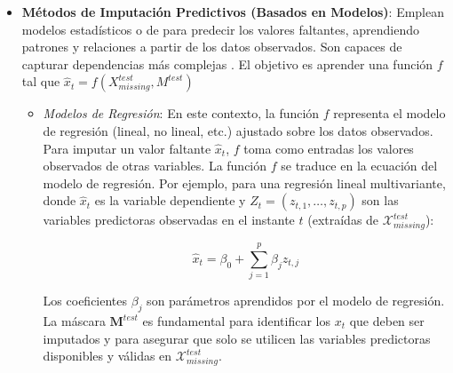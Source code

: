 \begin{itemize}
\begin{itemize}
            \item \textit{Imputación por Mediana}: Similar al anterior, pero utiliza la mediana de los valores observados, lo que lo hace más robusto a valores atípicos (outliers) \citep{Enders2010applied}:
            \begin{equation}
            \hat{x}_t = \text{mediana}(X_{\text{missing}})
            \label{eq:median_imputation}
            \end{equation}
            Comparte limitaciones similares a la imputación por media en cuanto a la distorsión de la estructura de la serie.
        \end{itemize}
        Aunque simples, estos métodos tienden a subestimar la varianza y aplanar la estructura temporal de la serie, y son generalmente inapropiados si la serie no es estacionaria o si los datos faltantes no son completamente al azar.

    \item \textbf{Métodos de Imputación Predictivos (Basados en Modelos)}:
    Emplean modelos estadísticos o de  para predecir los valores faltantes, aprendiendo patrones y relaciones a partir de los datos observados. Son capaces de capturar dependencias más complejas \citep{AbuMostafa2012}. El objetivo es aprender una función $f$ tal que $\hat{x}_t = f(X_{missing}^{test}, M^{test})$

        \begin{itemize}
            \item \textit{Modelos de Regresión}:
            En este contexto, la función $f$ representa el modelo de regresión (lineal, no lineal, etc.) ajustado sobre los datos observados. Para imputar un valor faltante $\hat{x}_t$, $f$ toma como entradas los valores observados de otras variables.
            La función $f$ se traduce en la ecuación del modelo de regresión. Por ejemplo, para una regresión lineal multivariante, donde $\hat{x}_t$ es la variable dependiente y $Z_t = (z_{t,1}, \ldots, z_{t,p})$ son las variables predictoras observadas en el instante $t$ (extraídas de $\mathcal{X}_{missing}^{test}$):
            
            \begin{equation}
            \hat{x}_t = \beta_0 + \sum_{j=1}^p \beta_j z_{t,j}
            \end{equation} 
            
            Los coeficientes $\beta_j$ son parámetros aprendidos por el modelo de regresión. La máscara $\mathbf{M}^{test}$ es fundamental para identificar los $x_t$ que deben ser imputados y para asegurar que solo se utilicen las variables predictoras disponibles y válidas en $\mathcal{X}_{missing}^{test}$.


\end{itemize}
\end{itemize}
